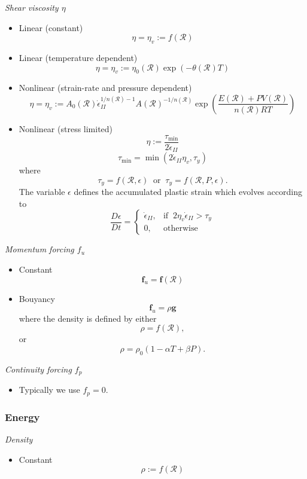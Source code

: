 \documentclass[paper=a4, fontsize=10pt,twoside]{scrartcl}
\begin{document}
\textit{Shear viscosity $\eta$}
\begin{itemize}
\item Linear (constant)
$$
	\eta = \eta_v := f(\mathcal R)
$$
\item Linear (temperature dependent)
$$
	\eta = \eta_v := \eta_0(\mathcal R) \exp( -\theta(\mathcal R) T)
$$
\item Nonlinear (strain-rate and pressure dependent)
$$
	\eta = \eta_v := A_0(\mathcal R) \dot{\epsilon}_{II}^{1/n(\mathcal R) - 1}
		 A(\mathcal R)^{-1/n(\mathcal R)} \exp\left(
		\frac{E(\mathcal R) + P V(\mathcal R)}{n(\mathcal R) R T}
	\right)
$$

\item Nonlinear (stress limited)
$$
	\eta := \frac{\tau_\text{min}}{2 \dot{\epsilon}_{II}}
$$
$$
	\tau_\text{min} = \min( 2 \dot{\epsilon}_{II} \eta_v, \tau_y )
$$
where
$$
	\tau_y = f(\mathcal R,\epsilon)
	\medspace
	\text{ or }
	\medspace
	\tau_y = f(\mathcal R,P,\epsilon).
$$
The variable $\epsilon$ defines the accumulated plastic strain which evolves according to
$$
	\frac{D\epsilon}{Dt}
	=
	\begin{cases}
    \dot{\epsilon}_{II}, & \text{if } \medspace 2 \eta_v \dot{\epsilon}_{II} > \tau_y \\
    0,                    & \text{otherwise}
	\end{cases}
$$
\end{itemize}

\textit{Momentum forcing $f_u$}
\begin{itemize}
\item Constant
$$
\boldsymbol f_u = \boldsymbol f(\mathcal R)
$$
\item Bouyancy
$$
\boldsymbol f_u = \rho \boldsymbol g
$$
where the density is defined by either
$$
\rho = f(\mathcal R),
$$
or
$$
\rho = \rho_0 ( 1 - \alpha T + \beta P ).
$$
\end{itemize}

\textit{Continuity forcing $f_p$}
\begin{itemize}
\item Typically we use $f_p = 0$.
\end{itemize}


\subsubsection*{Energy}

\textit{Density}
\begin{itemize}
\item Constant
$$
	\rho := f(\mathcal R)
$$
\end{itemize}
\end{document}
